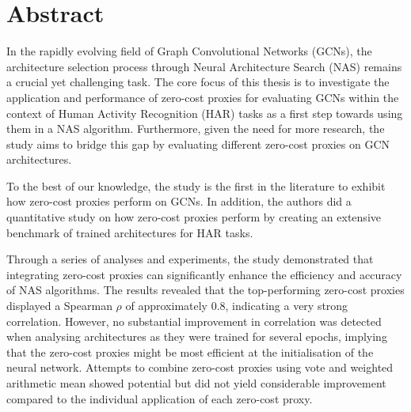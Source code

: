 \chapter*{Abstract}

In the rapidly evolving field of Graph Convolutional Networks (GCNs), the architecture selection process through Neural Architecture Search (NAS) remains a crucial yet challenging task. The core focus of this thesis is to investigate the application and performance of zero-cost proxies for evaluating GCNs within the context of Human Activity Recognition (HAR) tasks as a first step towards using them in a NAS algorithm. Furthermore, given the need for more research, the study aims to bridge this gap by evaluating different zero-cost proxies on GCN architectures. 

To the best of our knowledge, the study is the first in the literature to exhibit how zero-cost proxies perform on GCNs. In addition, the authors did a quantitative study on how zero-cost proxies perform by creating an extensive benchmark of trained architectures for HAR tasks.

Through a series of analyses and experiments, the study demonstrated that integrating zero-cost proxies can significantly enhance the efficiency and accuracy of NAS algorithms. The results revealed that the top-performing zero-cost proxies displayed a Spearman $\rho$ of approximately $0.8$, indicating a very strong correlation. However, no substantial improvement in correlation was detected when analysing architectures as they were trained for several epochs, implying that the zero-cost proxies might be most efficient at the initialisation of the neural network. Attempts to combine zero-cost proxies using vote and weighted arithmetic mean showed potential but did not yield considerable improvement compared to the individual application of each zero-cost proxy. 